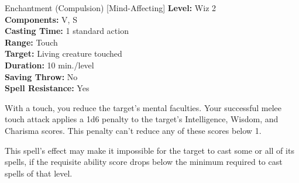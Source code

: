 {Enchantment (Compulsion) [Mind-Affecting]}
{
	\textbf{Level:}
	Wiz 2\\
	\textbf{Components:}
	V, S\\
	\textbf{Casting Time:}
	1 standard action\\
	\textbf{Range:}
	Touch\\
	\textbf{Target:}
	Living creature touched\\
	\textbf{Duration:}
	10 min./level\\
	\textbf{Saving Throw:}
	No\\
	\textbf{Spell Resistance:}
	Yes\\
}
{
	With a touch, you reduce the target's mental faculties. Your successful melee touch attack applies a 1d6 penalty to the target's Intelligence, Wisdom, and Charisma scores. This penalty can't reduce any of these scores below 1.

	This spell's effect may make it impossible for the target to cast some or all of its spells, if the requisite ability score drops below the minimum required to cast spells of that level.

}
